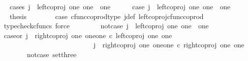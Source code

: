 \begin{isabellebody}
\ \ \isamarkupfalse%
{\isacharparenleft}{\kern0pt}cases\ {\isachardoublequoteopen}j\ {\isacharequal}{\kern0pt}\ left{\isacharunderscore}{\kern0pt}coproj\ one\ {\isacharparenleft}{\kern0pt}one\ {\isasymCoprod}\ one{\isacharparenright}{\kern0pt}{\isachardoublequoteclose}{\isacharparenright}{\kern0pt}\isanewline
\ \ \ \ \isamarkupfalse%
\ case{}{\isacharcolon}{\kern0pt}\ {\isachardoublequoteopen}j\ {\isacharequal}{\kern0pt}\ left{\isacharunderscore}{\kern0pt}coproj\ one\ {\isacharparenleft}{\kern0pt}one\ {\isasymCoprod}\ one{\isacharparenright}{\kern0pt}{\isachardoublequoteclose}\isanewline
\ \ \ \ \isamarkupfalse%
\ \isamarkupfalse%
\ {\isacharquery}{\kern0pt}thesis\isanewline
\ \ \ \ \ \ \isamarkupfalse%
\ case{}\ cfunc{\isacharunderscore}{\kern0pt}coprod{\isacharunderscore}{\kern0pt}type\ j{\isacharunderscore}{\kern0pt}def\ left{\isacharunderscore}{\kern0pt}coproj{\isacharunderscore}{\kern0pt}cfunc{\isacharunderscore}{\kern0pt}coprod\ \isamarkupfalse%
\ {\isacharparenleft}{\kern0pt}typecheck{\isacharunderscore}{\kern0pt}cfuncs{\isacharcomma}{\kern0pt}\ force{\isacharparenright}{\kern0pt}\isanewline
\ \ \isamarkupfalse%
\isanewline
\ \ \ \ \isamarkupfalse%
\ not{\isacharunderscore}{\kern0pt}case{}{\isacharcolon}{\kern0pt}\ {\isachardoublequoteopen}j\ {\isasymnoteq}\ left{\isacharunderscore}{\kern0pt}coproj\ one\ {\isacharparenleft}{\kern0pt}one\ {\isasymCoprod}\ one{\isacharparenright}{\kern0pt}{\isachardoublequoteclose}\isanewline
\ \ \ \ \isamarkupfalse%
\ \isamarkupfalse%
\ case{}{\isacharunderscore}{\kern0pt}or{\isacharunderscore}{\kern0pt}{}{\isacharcolon}{\kern0pt}\ {\isachardoublequoteopen}j\ {\isacharequal}{\kern0pt}\ right{\isacharunderscore}{\kern0pt}coproj\ one\ {\isacharparenleft}{\kern0pt}one{\isasymCoprod}one{\isacharparenright}{\kern0pt}\ {\isasymcirc}\isactrlsub c\ left{\isacharunderscore}{\kern0pt}coproj\ one\ one\ \ \ {\isasymor}\ \isanewline
\ \ \ \ \ \ \ \ \ \ \ \ \ \ \ \ \ \ \ \ \ \ \ \ \ \ \ j\ {\isacharequal}{\kern0pt}\ right{\isacharunderscore}{\kern0pt}coproj\ one\ {\isacharparenleft}{\kern0pt}one{\isasymCoprod}one{\isacharparenright}{\kern0pt}\ {\isasymcirc}\isactrlsub c\ right{\isacharunderscore}{\kern0pt}coproj\ one\ one{\isachardoublequoteclose}\isanewline
\ \ \ \ \ \ \isamarkupfalse%
\ not{\isacharunderscore}{\kern0pt}case{}\ set{\isacharunderscore}{\kern0pt}three\ \isamarkupfalse%

\end{isabellebody}
